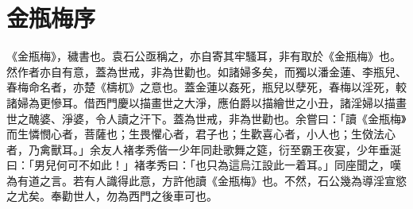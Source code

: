 \chapter*{金瓶梅序}


《金瓶梅》，穢書也。袁石公亟稱之，亦自寄其牢騷耳，非有取於《金瓶梅》也。然作者亦自有意，蓋為世戒，非為世勸也。如諸婦多矣，而獨以潘金蓮、李瓶兒、春梅命名者，亦楚《檮杌》之意也。蓋金蓮以姦死，瓶兒以孽死，春梅以淫死，較諸婦為更慘耳。借西門慶以描畫世之大淨，應伯爵以描繪世之小丑，諸淫婦以描畫世之醜婆、淨婆，令人讀之汗下。蓋為世戒，非為世勸也。余嘗曰：「讀《金瓶梅》而生憐憫心者，菩薩也；生畏懼心者，君子也；生歡喜心者，小人也；生傚法心者，乃禽獸耳。」余友人褚孝秀偕一少年同赴歌舞之筵，衍至霸王夜宴，少年垂涎曰：「男兒何可不如此！」褚孝秀曰：「也只為這烏江設此一着耳。」同座聞之，嘆為有道之言。若有人識得此意，方許他讀《金瓶梅》也。不然，石公幾為導淫宣慾之尤矣。奉勸世人，勿為西門之後車可也。

\begin{quotation}
\end{quotation}

